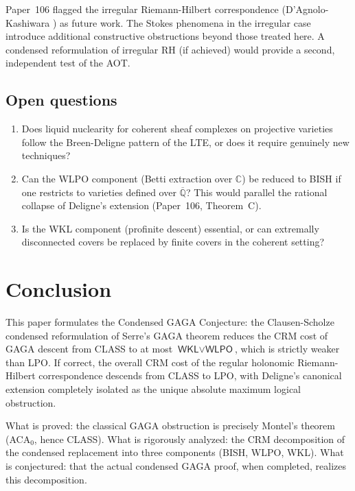\documentclass[11pt,a4paper]{article}
\theoremstyle{plain}
\theoremstyle{definition}
\newcommand{\BISH}{\textsf{BISH}}
\newcommand{\WKL}{\textsf{WKL}}
\newcommand{\WLPO}{\textsf{WLPO}}
\newcommand{\LPO}{\textsf{LPO}}
\newcommand{\CLASS}{\textsf{CLASS}}
\newcommand{\Q}{\mathbb{Q}}
\newcommand{\C}{\mathbb{C}}
\begin{document}
Paper~106 flagged the irregular Riemann-Hilbert correspondence (D'Agnolo-Kashiwara \cite{DAgnoloKashiwara2016}) as future work.
The Stokes phenomena in the irregular case introduce additional constructive obstructions beyond those treated here.
A condensed reformulation of irregular RH (if achieved) would provide a second, independent test of the AOT.

\subsection{Open questions}

\begin{enumerate}[nosep]
\item Does liquid nuclearity for coherent sheaf complexes on projective varieties follow the Breen-Deligne pattern of the LTE, or does it require genuinely new techniques?
\item Can the \WLPO{} component (Betti extraction over $\C$) be reduced to \BISH{} if one restricts to varieties defined over $\overline{\Q}$?
This would parallel the rational collapse of Deligne's extension (Paper~106, Theorem~C).
\item Is the \WKL{} component (profinite descent) essential, or can extremally disconnected covers be replaced by finite covers in the coherent setting?
\end{enumerate}

\section{Conclusion}
\label{sec:conclusion}

This paper formulates the Condensed GAGA Conjecture: the Clausen-Scholze condensed reformulation of Serre's GAGA theorem reduces the CRM cost of GAGA descent from \CLASS{} to at most $\WKL \vee \WLPO$, which is strictly weaker than \LPO.
If correct, the overall CRM cost of the regular holonomic Riemann-Hilbert correspondence descends from \CLASS{} to \LPO, with Deligne's canonical extension completely isolated as the unique absolute maximum logical obstruction.

What is proved: the classical GAGA obstruction is precisely Montel's theorem (ACA$_0$, hence \CLASS).
What is rigorously analyzed: the CRM decomposition of the condensed replacement into three components (\BISH, \WLPO, \WKL).
What is conjectured: that the actual condensed GAGA proof, when completed, realizes this decomposition.
\end{document}
